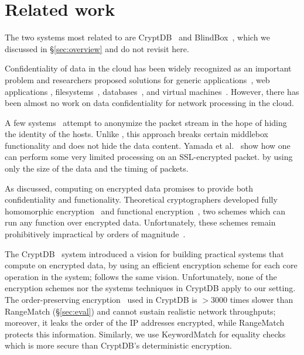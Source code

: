 
\section{Related work}\label{sec:related}
The two systems most related to \sys are CryptDB~\cite{popa:cryptdb} and BlindBox~\cite{blindbox}, which we discussed in \S\ref{sec:overview} and do not revisit here.


Confidentiality of data in the cloud has been widely recognized as an important problem and researchers proposed solutions for generic applications~\cite{Baumann:Haven}, web applications \cite{giffin:hails, Mylar},  filesystems~\cite{blaze:cfs, kallahalla:plutus, goh:sirius},  databases~\cite{popa:cryptdb},  and virtual machines~\cite{Zhang:CloudVisor}. However, there has been almost no work on data confidentiality for network processing in the cloud. 

A few systems~\cite{Vern:Anonymize03, Vern:Anonymize06} attempt to anonymize the packet stream in the hope of hiding the identity of the hosts.
Unlike \sys, this approach breaks certain middlebox functionality and does not hide the data content.
Yamada et al.~\cite{Yamada_IDS} show how one can perform some very limited processing on an 
SSL-encrypted packet.
     by using only the size of the data and the timing of packets. %


As discussed, computing on encrypted data promises to provide both confidentiality and functionality. Theoretical cryptographers developed fully homomorphic encryption~\cite{gentry:fhe, gentry:fhe-aes-eprint} and functional encryption~\cite{BSW11}, two schemes which can run any function over encrypted data. Unfortunately, these schemes remain prohibitively impractical by orders of magnitude~\cite{gentry:fhe-aes-eprint}.

The CryptDB~\cite{popa:cryptdb} system introduced a vision for building practical systems that compute on encrypted data, by using an efficient encryption scheme for each core operation in the system; \sys follows the same  vision. Unfortunately, none of the encryption schemes nor the systems techniques in CryptDB apply to our setting.  The order-preserving encryption~\cite{boldyreva:ope} used in CryptDB is 
 $>3000$ times slower than RangeMatch (\S\ref{sec:eval}) and cannot sustain realistic network throughputs; moreover, it leaks the order of the IP addresses encrypted, while RangeMatch protects this information. Similarly, we use KeywordMatch for equality checks which is more secure than CryptDB's deterministic encryption.%

